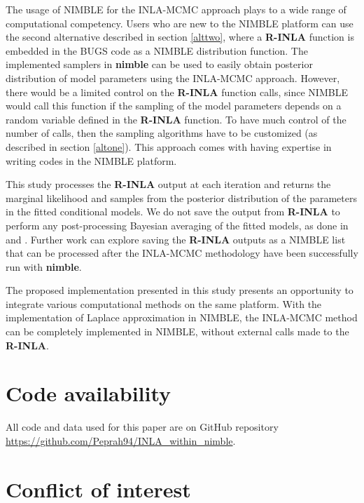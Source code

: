 \documentclass[
]{article}
\begin{document}
The usage of NIMBLE for the INLA-MCMC approach plays to a wide range of
computational competency. Users who are new to the NIMBLE platform can
use the second alternative described in section \ref{alttwo}, where a
\textbf{R-INLA} function is embedded in the BUGS code as a NIMBLE
distribution function. The implemented samplers in \textbf{nimble} can
be used to easily obtain posterior distribution of model parameters
using the INLA-MCMC approach. However, there would be a limited control
on the \textbf{R-INLA} function calls, since NIMBLE would call this
function if the sampling of the model parameters depends on a random
variable defined in the \textbf{R-INLA} function. To have much control
of the number of calls, then the sampling algorithms have to be
customized (as described in section \ref{altone}). This approach comes
with having expertise in writing codes in the NIMBLE platform.

This study processes the \textbf{R-INLA} output at each iteration and
returns the marginal likelihood and samples from the posterior
distribution of the parameters in the fitted conditional models. We do
not save the output from \textbf{R-INLA} to perform any post-processing
Bayesian averaging of the fitted models, as done in
\cite{berild2022importance} and \cite{gomez2018markov}. Further work can
explore saving the \textbf{R-INLA} outputs as a NIMBLE list that can be
processed after the INLA-MCMC methodology have been successfully run
with \textbf{nimble}.

The proposed implementation presented in this study presents an
opportunity to integrate various computational methods on the same
platform. With the implementation of Laplace approximation in NIMBLE,
the INLA-MCMC method can be completely implemented in NIMBLE, without
external calls made to the \textbf{R-INLA}.

\hypertarget{code-availability}{%
\section{Code availability}\label{code-availability}}

All code and data used for this paper are on GitHub repository
\url{https://github.com/Peprah94/INLA_within_nimble}.

\hypertarget{conflict-of-interest}{%
\section{Conflict of interest}\label{conflict-of-interest}}
\end{document}
